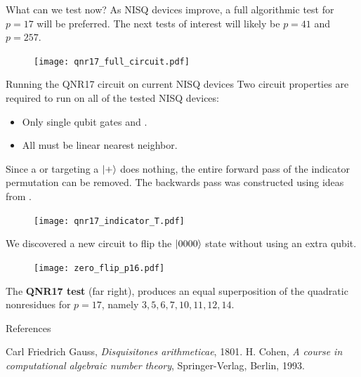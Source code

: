 \documentclass[final]{beamer}
\newlength{\colwidth}
\begin{document}
\begin{frame}[t]
\begin{columns}[t]
\begin{column}{\colwidth}
\begin{block}{What can we test now?}
    As NISQ devices improve, a full algorithmic test for $p=17$ will be preferred.
    The next tests of interest will likely be $p=41$ and $p=257$.


  \begin{center}
    \begin{figure}
      \texttt{[image: qnr17\_full\_circuit.pdf]}
    \end{figure}
  \end{center}

  \end{block}

  \begin{block}{Running the QNR17 circuit on current NISQ devices}
    Two circuit properties are required to run on all of the tested NISQ devices:
    \begin{itemize}
      \item Only single qubit gates and \CNOTs.
      \item All \CNOTs must be linear nearest neighbor.
    \end{itemize}

    Since a \CNOT or \CCNOT targeting a $\left| + \right\rangle$ does nothing, the entire forward pass of the indicator permutation can be removed.
    The backwards pass was constructed using ideas from \cite{3957}. 
    \begin{figure}
      \texttt{[image: qnr17\_indicator\_T.pdf]}
    \end{figure}

    We discovered a new circuit to flip the $\left| 0000 \right\rangle$ state without using an extra qubit.%

    \begin{figure}
      \texttt{[image: zero\_flip\_p16.pdf]}
    \end{figure}

    The {\bf QNR17 test} (far right), produces an equal superposition of the quadratic nonresidues for $p=17$, namely $3,5,6,7,10,11,12,14$.
  \end{block}


  \begin{block}{References}
    {\fontsize{15pt}{15pt}\selectfont
\begin{thebibliography}{100} %
   Carl Friedrich Gauss, \emph{Disquisitones arithmeticae}, 1801.
   H. Cohen, \emph{A course in computational algebraic number theory}, Springer-Verlag, Berlin, 1993.


\end{thebibliography}}
\end{block}
\end{column}
\end{columns}
\end{frame}
\end{document}
